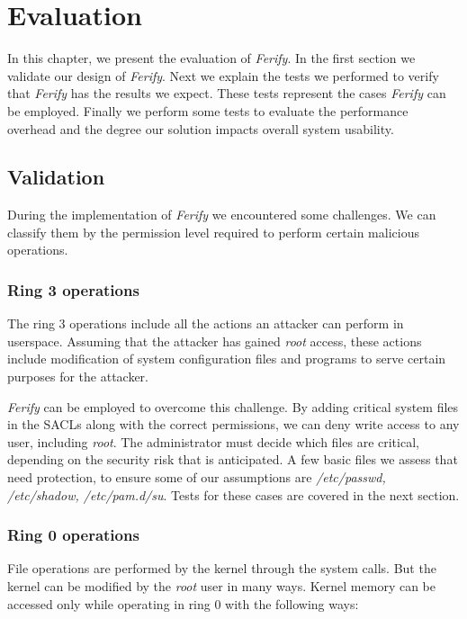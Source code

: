\acresetall
\chapter{Evaluation}\label{ch:chapter4}

In this chapter, we present the evaluation of \emph{Ferify}. In the first section we validate our design of \emph{Ferify}. Next we explain the tests we performed to verify that \emph{Ferify} has the results we expect. These tests represent the cases \emph{Ferify} can be employed. Finally we perform some tests to evaluate the performance overhead and the degree our solution impacts overall system usability.

\section{Validation}\label{sec:validation}

\par During the implementation of \emph{Ferify} we encountered some challenges. We can classify them by the permission level required to perform certain malicious operations. 

\subsection{Ring 3 operations}

\par The ring 3 operations include all the actions an attacker can perform in userspace. Assuming that the attacker has gained \emph{root} access, these actions include modification of system configuration files and programs to serve certain purposes for the attacker. 
\par \emph{Ferify} can be employed to overcome this challenge. By adding critical system files in the \acp{SACL} along with the correct permissions, we can deny write access to any user, including \emph{root}. The administrator must decide which files are critical, depending on the security risk that is anticipated. A few basic files we assess that need protection, to ensure some of our assumptions are \emph{/etc/passwd, /etc/shadow, /etc/pam.d/su}. Tests for these cases are covered in the next section.

\subsection{Ring 0 operations}

\par File operations are performed by the kernel through the system calls. But the kernel can be modified by the \emph{root} user in many ways. Kernel memory can be accessed only while operating in ring 0 with the following ways:

